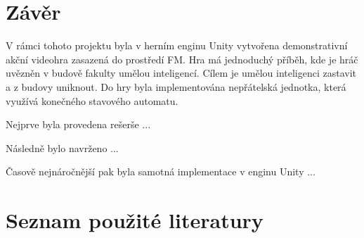 \documentclass[FM,Proj]{tulthesis}
\begin{document}
	\chapter{Závěr}
	
	V rámci tohoto projektu byla v herním enginu Unity vytvořena demonstrativní akční videohra zasazená do prostředí FM. Hra má jednoduchý příběh, kde je hráč uvězněn v budově fakulty umělou inteligencí. Cílem je umělou inteligenci zastavit a z budovy uniknout. Do hry byla implementována nepřátelská jednotka, která využívá konečného stavového automatu.
	
	Nejprve byla provedena rešerše ...
	
	Následně bylo navrženo ...
	
	Časově nejnáročnější pak byla samotná implementace v enginu Unity ...
	
	\chapter*{Seznam použité literatury}
	\printbibliography[heading=none]
	
\end{document}
